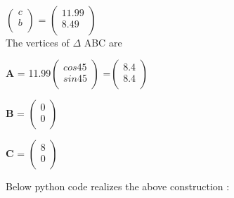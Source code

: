 \documentclass[10pt,a4paper]{report}
\begin{document}
\begin{multicols}{2}
   \\  
      $\begin{pmatrix}
            c\\
            b\\
        \end{pmatrix}$%
            =
            $\begin{pmatrix}
            11.99\\
            8.49\\
        \end{pmatrix}$%
        \vspace{3mm}
   \\  The vertices of $\Delta$ ABC are \\ \vspace{3mm}
     \raggedright \textbf{A} = 11.99$\begin{pmatrix}
                 cos 45 \\ 
                 sin 45 \\
              \end{pmatrix}$%
              =$\begin{pmatrix}
                 8.4 \\
                 8.4 \\
                 \end{pmatrix}$%
                 \vspace{5mm}
              \\ \raggedright  \textbf{B} = $\begin{pmatrix}
                 0\\
                 0\\
              \end{pmatrix}$%
              \vspace{5mm}
             \\ \raggedright  \textbf{C} = $\begin{pmatrix}
                  8\\
                  0\\
              \end{pmatrix}$%
 \begin{center}
Below python code realizes the above construction : 
\end{center}

\end{multicols}
\end{document}
